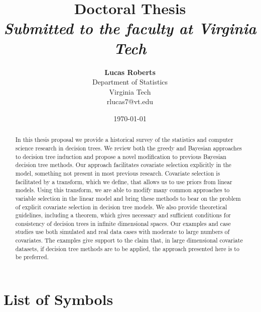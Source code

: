 \documentclass[12pt]{article}
\title{{\bf Doctoral Thesis } \\
\it Submitted to the faculty at Virginia Tech}
\author{ {\bf Lucas Roberts}  \\
Department of Statistics \\
Virginia Tech \\
{\small rlucas7@vt.edu}
}
\date{\today}
\def\listofsymbols{ \clearpage}
\begin{document}
\pagestyle{plain}
\maketitle


\pagebreak
\begin{abstract}
In this thesis proposal we provide a historical survey of the statistics and computer science research in decision trees. We review both the greedy and Bayesian approaches to decision tree induction and propose a novel modification to previous Bayesian decision tree methods. Our approach facilitates covariate selection explicitly in the model, something not present in most previous research. Covariate selection is facilitated by a transform, which we define,  that allows us to use priors from linear models. Using this transform, we are able to modify many common approaches to variable selection in the linear model and bring these methods to bear on the problem of explicit covariate selection in decision tree models. We also provide theoretical guidelines, including a theorem, which gives necessary and sufficient conditions for consistency of decision trees in infinite dimensional spaces. Our examples and case studies use both simulated and real data cases with moderate to large numbers of covariates. The examples give support to the claim that, in large dimensional covariate datasets, if decision tree methods are to be applied, the approach presented here is to be preferred.   


\end{abstract}

\pagebreak
\tableofcontents
\pagebreak

\listoffigures
\pagebreak

\listoftables
\pagebreak

\clearpage
{}
\chapter{\LARGE{\textbf{List of Symbols}}}
\listofsymbols
\pagebreak
\end{document}

